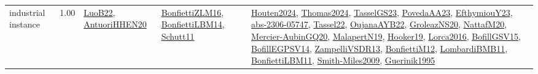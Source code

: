 {\begin{longtable}{p{3cm}r>{\raggedright\arraybackslash}p{6cm}>{\raggedright\arraybackslash}p{6cm}>{\raggedright\arraybackslash}p{8cm}}
\index{industrial instance}\index{Benchmarks!industrial instance}industrial instance &  1.00 & \hyperref[detail:LuoB22]{LuoB22}, \hyperref[detail:AntuoriHHEN20]{AntuoriHHEN20} & \hyperref[detail:BonfiettiZLM16]{BonfiettiZLM16}, \hyperref[detail:BonfiettiLBM14]{BonfiettiLBM14}, \hyperref[detail:Schutt11]{Schutt11} & \hyperref[detail:Houten2024]{Houten2024}, \hyperref[detail:Thomas2024]{Thomas2024}, \hyperref[detail:TasselGS23]{TasselGS23}, \hyperref[detail:PovedaAA23]{PovedaAA23}, \hyperref[detail:EfthymiouY23]{EfthymiouY23}, \hyperref[detail:abs-2306-05747]{abs-2306-05747}, \hyperref[detail:Tassel22]{Tassel22}, \hyperref[detail:OujanaAYB22]{OujanaAYB22}, \hyperref[detail:GroleazNS20]{GroleazNS20}, \hyperref[detail:NattafM20]{NattafM20}, \hyperref[detail:Mercier-AubinGQ20]{Mercier-AubinGQ20}, \hyperref[detail:MalapertN19]{MalapertN19}, \hyperref[detail:Hooker19]{Hooker19}, \hyperref[detail:Lorca2016]{Lorca2016}, \hyperref[detail:BofillGSV15]{BofillGSV15}, \hyperref[detail:BofillEGPSV14]{BofillEGPSV14}, \hyperref[detail:ZampelliVSDR13]{ZampelliVSDR13}, \hyperref[detail:BonfiettiM12]{BonfiettiM12}, \hyperref[detail:LombardiBMB11]{LombardiBMB11}, \hyperref[detail:BonfiettiLBM11]{BonfiettiLBM11}, \hyperref[detail:Smith-Miles2009]{Smith-Miles2009}, \hyperref[detail:Guerinik1995]{Guerinik1995}\\

\end{longtable}}
